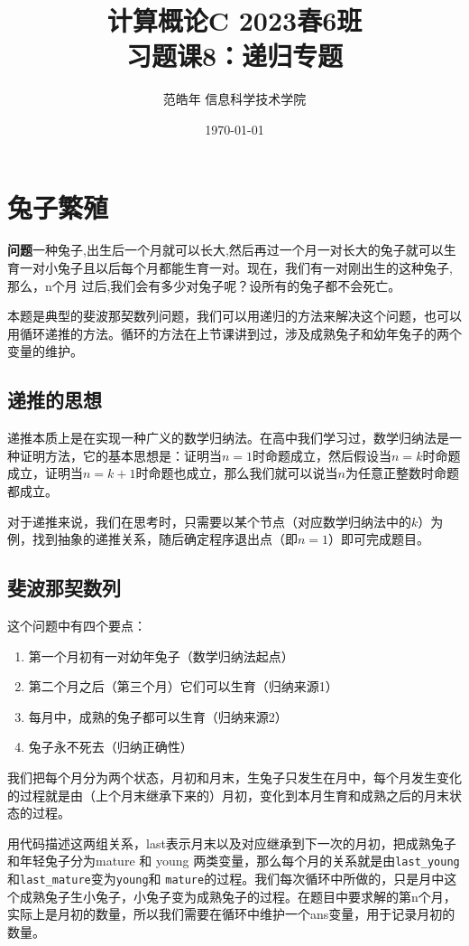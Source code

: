 \documentclass{article}
\title{ \normalsize{计算概论C 2023春6班} \\ \huge 习题课8：递归专题}
\author{ 范皓年 \quad 信息科学技术学院}
\date{\today}
\begin{document}
\maketitle

\tableofcontents
\newpage

\section{兔子繁殖}
\textbf{问题}\quad 一种兔子,出生后一个月就可以长大,然后再过一个月一对长大的兔子就可以生育一对小兔子且以后每个月都能生育一对。现在，我们有一对刚出生的这种兔子,那么，n个月
过后,我们会有多少对兔子呢？设所有的兔子都不会死亡。

本题是典型的斐波那契数列问题，我们可以用递归的方法来解决这个问题，也可以用循环递推的方法。循环的方法在上节课讲到过，涉及成熟兔子和幼年兔子的两个变量的维护。

\subsection{递推的思想}

递推本质上是在实现一种广义的数学归纳法。在高中我们学习过，数学归纳法是一种证明方法，它的基本思想是：证明当$n=1$时命题成立，然后假设当$n=k$时命题成立，证明当$n=k+1$时命题也成立，那么我们就可以说当$n$为任意正整数时命题都成立。

对于递推来说，我们在思考时，只需要以某个节点（对应数学归纳法中的$k$）为例，找到抽象的递推关系，随后确定程序退出点（即$n=1$）即可完成题目。

\subsection{斐波那契数列}

这个问题中有四个要点：
\begin{enumerate}
    \item 第一个月初有一对幼年兔子（数学归纳法起点）
    \item 第二个月之后（第三个月）它们可以生育（归纳来源1）
    \item 每月中，成熟的兔子都可以生育（归纳来源2）
    \item 兔子永不死去（归纳正确性）
\end{enumerate}

我们把每个月分为两个状态，月初和月末，生兔子只发生在月中，每个月发生变化的过程就是由（上个月末继承下来的）月初，变化到本月生育和成熟之后的月末状态的过程。

用代码描述这两组关系，last表示月末以及对应继承到下一次的月初，把成熟兔子和年轻兔子分为mature 和 young 两类变量，那么每个月的关系就是由\lstinline|last_young|和\lstinline|last_mature|变为\lstinline|young|和 \lstinline|mature|的过程。我们每次循环中所做的，只是月中这个成熟兔子生小兔子，小兔子变为成熟兔子的过程。在题目中要求解的第n个月，实际上是月初的数量，所以我们需要在循环中维护一个ans变量，用于记录月初的数量。
\end{document}

